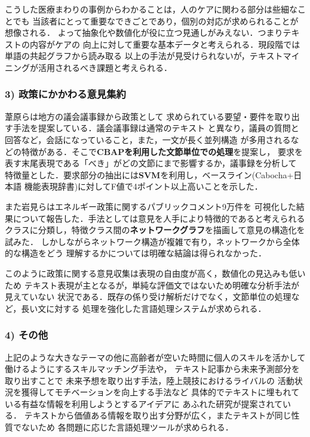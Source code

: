 \documentclass[twocolumn]{jarticle}
\begin{document}
{こうした医療まわりの事例からわかることは，人のケアに関わる部分は些細なことでも
当該者にとって重要なできごとであり，個別の対応が求められることが想像される．
よって抽象化や数値化が役に立つ見通しがみえない．つまりテキストの内容がケアの
向上に対して重要な基本データと考えられる．現段階では単語の共起グラフから読み取る
以上の手法が見受けられないが，テキストマイニングが活用されるべき課題と考えられる．


\subsubsection*{3) 政策にかかわる意見集約}
葦原ら\cite{ashihara2012}は地方の議会議事録から政策として
求められている要望・要件を取り出す手法を提案している．議会議事録は通常のテキスト
と異なり，議員の質問と回答など，会話になっていること，また，一文が長く並列構造
が多用されるなどの特徴がある．そこで{\bf CBAP\cite{maruyama2003}を利用した文節単位での処理}を提案し，
要求を表す末尾表現である「べき」がどの文節にまで影響するか，議事録を分析して
特徴量とした．要求部分の抽出には{\bf SVM}を利用し，ベースライン(Cabocha+日本語
機能表現辞書)に対してF値で4ポイント以上高いことを示した．

また岩見ら\cite{iwami2016}はエネルギー政策に関するパブリックコメント9万件を
可視化した結果について報告した．手法としては意見を人手により特徴的であると考えられる
クラスに分類し，特徴クラス間の{\bf ネットワークグラフ}を描画して意見の構造化を試みた．
しかしながらネットワーク構造が複雑で有り，ネットワークから全体的な構造をどう
理解するかについては明確な結論は得られなかった．

このように政策に関する意見収集は表現の自由度が高く，数値化の見込みも低いため
テキスト表現が主となるが，単純な評価文ではないため明確な分析手法が見えていない
状況である．既存の係り受け解析だけでなく，文節単位の処理など，長い文に対する
処理を強化した言語処理システムが求められる．

\subsubsection*{4) その他}
上記のような大きなテーマの他に高齢者が空いた時間に個人のスキルを活かして
働けるようにするスキルマッチング手法\cite{miura2015}や，
テキスト記事から未来予測部分を取り出すことで
未来予想を取り出す手法\cite{shimaoka2015}，陸上競技におけるライバルの
活動状況を獲得してモチベーションを向上する手法\cite{sano2016}など
具体的でテキストに埋もれている有益な情報を利用しようとするアイデアに
あふれた研究が提案されている．
テキストから価値ある情報を取り出す分野が広く，またテキストが同じ性質でないため
各問題に応じた言語処理ツールが求められる．


}
\end{document}
